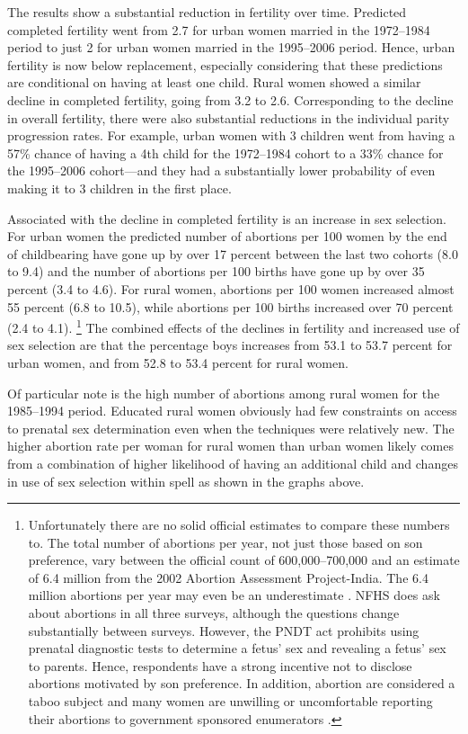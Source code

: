 \documentclass[12pt,letterpaper]{article}
\begin{document}
The results show a substantial reduction in fertility over time.
Predicted completed fertility went from 2.7 for urban women married in  
the 1972--1984 period to just 2 for urban women married in the 1995--2006 period.
Hence, urban fertility is now below replacement, especially considering that
these predictions are conditional on having at least one child.
Rural women showed a similar decline in completed fertility, going from 3.2 to 2.6.
Corresponding to the decline in overall fertility, there were also substantial
reductions in the individual parity progression rates.
For example, urban women with 3 children went from having a 57\% chance of having a 
4th child for the 1972--1984 cohort to a 33\% chance for the 1995--2006 cohort---and 
they had a substantially lower probability of even making it to 3 children
in the first place.

Associated with the decline in completed fertility is an increase in sex selection.
For urban women the predicted number of abortions per 100 women by the end of
childbearing have gone up by over 17 percent between the last two cohorts (8.0 to 9.4) 
and the number of abortions per 100 births have gone up by over 35 percent (3.4 to 4.6).
For rural women, abortions per 100 women increased almost 55 percent (6.8 to 10.5), 
while abortions per 100 births increased over 70 percent (2.4 to 4.1).%
\footnote{
Unfortunately there are no solid official estimates to compare these numbers to.
The total number of abortions per year, not just those based on son preference, vary 
between the official count of 600,000--700,000 
and an estimate of 6.4 million from the 2002 Abortion Assessment Project-India.
The 6.4 million abortions per year may even be an underestimate \citep{Stillman2014}.
NFHS does ask about abortions in all three surveys, although the questions change 
substantially between surveys.
However, the PNDT act prohibits using prenatal diagnostic tests to determine a fetus' sex
and revealing a fetus' sex to parents.
Hence, respondents have a strong incentive not to disclose abortions motivated by son 
preference. 
In addition, abortion are considered a taboo subject and many women are unwilling or 
uncomfortable reporting their abortions to government sponsored enumerators 
\citep{Rossier2003,Stillman2014}.
}
The combined effects of the declines in fertility and increased use of sex selection
are that the percentage boys increases from 53.1 to 53.7 percent for urban
women, and from 52.8 to 53.4 percent for rural women.

Of particular note is the high number of abortions among rural women for the 
1985--1994 period.
Educated rural women obviously had few constraints on access to 
prenatal sex determination even when the techniques were relatively new.
The higher abortion rate per woman for rural women than urban women likely comes from
a combination of higher likelihood of having an additional child and changes in use of 
sex selection within spell as shown in the graphs above. 
\end{document}
